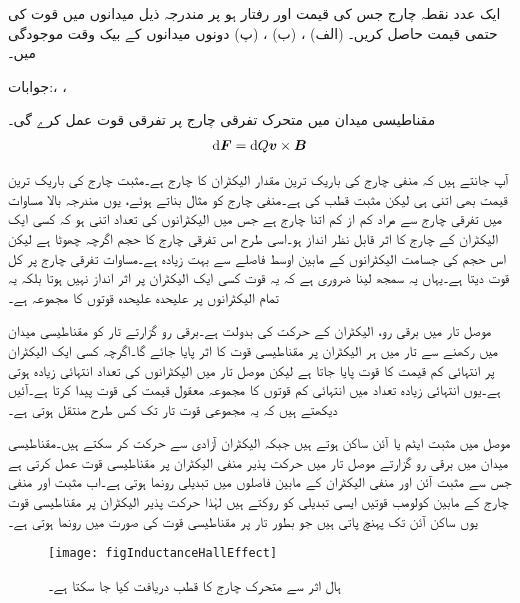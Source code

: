 ایک عدد نقطہ چارج جس کی قیمت  اور رفتار  ہو پر مندرجہ ذیل میدانوں میں قوت کی حتمی قیمت حاصل کریں۔
(الف) ، (ب) ، (پ) دونوں میدانوں کے بیک وقت موجودگی میں۔

جوابات:،  ، 

مقناطیسی میدان میں متحرک تفرقی چارج  پر تفرقی قوت  عمل کرے گی۔  
\begin{align}\label{مساوات_امالہ_مقناطیسی_تفرقی_قوت}
\dif \kvec{F}=\dif Q \kvec{v} \times \kvec{B}
\end{align}

آپ جانتے ہیں کہ منفی چارج کی باریک ترین مقدار الیکٹران کا چارج ہے۔مثبت چارج کی باریک ترین قیمت بھی اتنی ہی لیکن مثبت قطب کی ہے۔منفی چارج کو مثال بناتے ہوئے، یوں مندرجہ بالا مساوات میں تفرقی چارج سے مراد کم از کم اتنا چارج ہے جس میں الیکٹرانوں کی تعداد اتنی ہو کہ کسی ایک الیکٹران کے چارج کا اثر قابل نظر انداز ہو۔اسی طرح اس تفرقی چارج کا حجم اگرچہ چھوٹا ہے لیکن اس حجم کی جسامت الیکٹرانوں کے مابین اوسط فاصلے سے بہت زیادہ ہے۔مساوات  تفرقی چارج پر کل قوت دیتا ہے۔یہاں یہ سمجھ لینا ضروری ہے کہ یہ قوت کسی ایک الیکٹران پر اثر انداز نہیں ہوتا بلکہ یہ تمام الیکٹرانوں پر علیحدہ علیحدہ قوتوں کا مجموعہ ہے۔ 

موصل تار میں برقی رو، الیکٹران کے حرکت کی بدولت ہے۔برقی رو گزارتے تار کو مقناطیسی میدان میں رکھنے سے تار میں ہر الیکٹران پر مقناطیسی قوت کا اثر پایا جائے گا۔اگرچہ کسی ایک الیکٹران پر انتہائی کم قیمت کا قوت پایا جاتا ہے لیکن موصل تار میں الیکٹرانوں کی تعداد انتہائی زیادہ ہوتی ہے۔یوں انتہائی زیادہ تعداد میں انتہائی کم قوتوں کا مجموعہ معقول قیمت کی قوت پیدا کرتا ہے۔آئیں دیکھتے ہیں کہ یہ مجموعی قوت تار تک کس طرح منتقل ہوتی ہے۔

موصل میں مثبت ایٹم یا آئن ساکن ہوتے ہیں جبکہ الیکٹران آزادی سے حرکت کر سکتے ہیں۔مقناطیسی میدان میں برقی رو گزارتے موصل تار میں حرکت پذیر منفی الیکٹران پر مقناطیسی قوت عمل کرتی ہے جس سے مثبت آئن اور منفی الیکٹران کے مابین فاصلوں میں تبدیلی رونما ہوتی ہے۔اب مثبت اور منفی چارج کے مابین کولومب قوتیں ایسی تبدیلی کو روکتے ہیں لہٰذا حرکت پذیر الیکٹران پر مقناطیسی قوت یوں ساکن آئن تک پہنچ پاتی ہیں جو بطور تار پر مقناطیسی قوت کی صورت میں رونما ہوتی ہے۔

\begin{figure}
\centering
\texttt{[image: figInductanceHallEffect]}
\caption{ہال اثر سے متحرک چارج کا قطب دریافت کیا جا سکتا ہے۔}
\label{شکل_امالہ_ہال_قطب_کا_حصول}
\end{figure}

